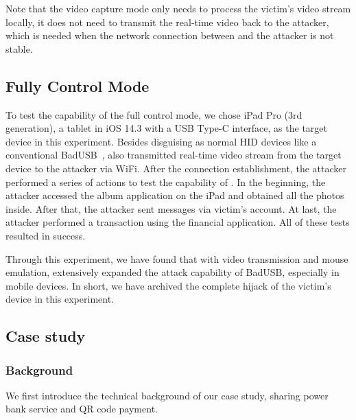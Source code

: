 Note that the video capture mode only needs to
process the victim's video stream locally, it does not need to transmit the real-time video back to the attacker, which is needed when the network connection between \tool and the attacker is not stable.

\subsection{Fully Control Mode}

To test the capability of the full control mode, we chose iPad Pro (3rd
	generation), a tablet in iOS 14.3 with a USB Type-C interface, as the target
device in this experiment.  Besides disguising as normal HID devices like a
conventional BadUSB~\cite{badusb}, \tool also transmitted real-time video
stream from the target device to the attacker via WiFi.  After the connection
establishment, the attacker performed a series of actions to test the capability of
\tool. In the beginning, the attacker accessed the album application on the iPad and
obtained all the photos inside. After that, the attacker sent messages via victim's
account. At last, the attacker performed a transaction using the
financial application. All of these tests resulted in success.

Through this experiment, we have found that with video transmission and mouse
emulation, \tool extensively expanded the attack capability of BadUSB,
especially in mobile devices. In short, we have archived the complete hijack of the victim's
device in this experiment.

\subsection{Case study}
\label{subsec:case_study}

\subsubsection{Background}

We first introduce the technical background of our case study, sharing power
bank service and QR code payment.

